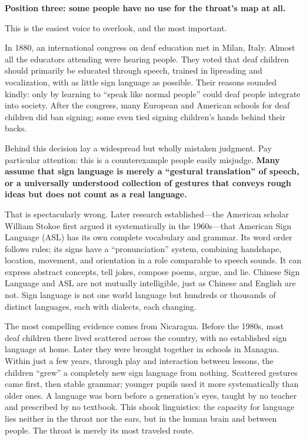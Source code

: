 \textbf{Position three: some people have no use for the throat's map at all.}

This is the easiest voice to overlook, and the most important.

In 1880, an international congress on deaf education met in Milan, Italy. Almost all the educators attending were hearing people. They voted that deaf children should primarily be educated through speech, trained in lipreading and vocalization, with as little sign language as possible. Their reasons sounded kindly: only by learning to ``speak like normal people'' could deaf people integrate into society. After the congress, many European and American schools for deaf children did ban signing; some even tied signing children's hands behind their backs.

Behind this decision lay a widespread but wholly mistaken judgment. Pay particular attention: this is a counterexample people easily misjudge. \textbf{Many assume that sign language is merely a ``gestural translation'' of speech, or a universally understood collection of gestures that conveys rough ideas but does not count as a real language.}

That is spectacularly wrong. Later research established---the American scholar William Stokoe first argued it systematically in the 1960s---that American Sign Language (ASL) has its own complete vocabulary and grammar. Its word order follows rules; its signs have a ``pronunciation'' system, combining handshape, location, movement, and orientation in a role comparable to speech sounds. It can express abstract concepts, tell jokes, compose poems, argue, and lie. Chinese Sign Language and ASL are not mutually intelligible, just as Chinese and English are not. Sign language is not one world language but hundreds or thousands of distinct languages, each with dialects, each changing.

The most compelling evidence comes from Nicaragua. Before the 1980s, most deaf children there lived scattered across the country, with no established sign language at home. Later they were brought together in schools in Managua. Within just a few years, through play and interaction between lessons, the children ``grew'' a completely new sign language from nothing. Scattered gestures came first, then stable grammar; younger pupils used it more systematically than older ones. A language was born before a generation's eyes, taught by no teacher and prescribed by no textbook. This shook linguistics: the capacity for language lies neither in the throat nor the ears, but in the human brain and between people. The throat is merely its most traveled route.

